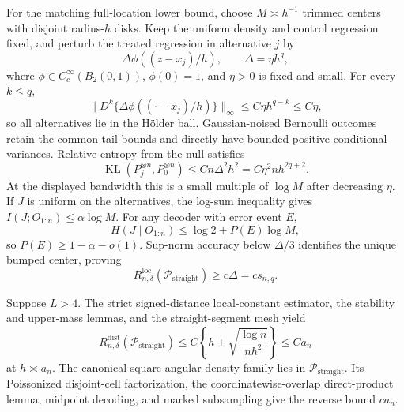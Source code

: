 For the matching full-location lower bound, choose \(M\asymp h^{-1}\) trimmed centers with disjoint radius-\(h\) disks.  Keep the uniform density and control regression fixed, and perturb the treated regression in alternative \(j\) by
\[
 \Delta\phi((z-x_j)/h),
 \qquad \Delta=\eta h^q,
\]
where \(\phi\in C_c^\infty(B_2(0,1))\), \(\phi(0)=1\), and \(\eta>0\) is fixed and small.  For every \(k\leq q\),
\[
 \lVert D^k\{\Delta\phi((\cdot-x_j)/h)\}\rVert_\infty
 \leq C\eta h^{q-k}\leq C\eta,
\]
so all alternatives lie in the H\"older ball.  Gaussian-noised Bernoulli outcomes retain the common tail bounds and directly have bounded positive conditional variances.  Relative entropy from the null satisfies
\[
 \operatorname{KL}(P_j^{\otimes n},P_0^{\otimes n})
 \leq Cn\Delta^2h^2=C\eta^2nh^{2q+2}.
\]
At the displayed bandwidth this is a small multiple of \(\log M\) after decreasing \(\eta\).  If \(J\) is uniform on the alternatives, the log-sum inequality gives \(I(J;O_{1:n})\leq\alpha\log M\).  For any decoder with error event \(E\),
\[
 H(J\mid O_{1:n})\leq\log2+P(E)\log M,
\]
so \(P(E)\geq1-\alpha-o(1)\).  Sup-norm accuracy below \(\Delta/3\) identifies the unique bumped center, proving
\[
 R_{n,\delta}^{\mathrm{loc}}(\mathcal P_{\mathrm{straight}})
 \geq c\Delta=cs_{n,q}.
\]

Suppose \(L>4\).  The strict signed-distance local-constant estimator, the stability and upper-mass lemmas, and the straight-segment mesh yield
\[
 R_{n,\delta}^{\mathrm{dist}}(\mathcal P_{\mathrm{straight}})
 \leq C\left\{h+\sqrt{\frac{\log n}{nh^2}}\right\}\leq Ca_n
\]
at \(h\asymp a_n\).  The canonical-square angular-density family lies in \(\mathcal P_{\mathrm{straight}}\).  Its Poissonized disjoint-cell factorization, the coordinatewise-overlap direct-product lemma, midpoint decoding, and marked subsampling give the reverse bound \(ca_n\).


